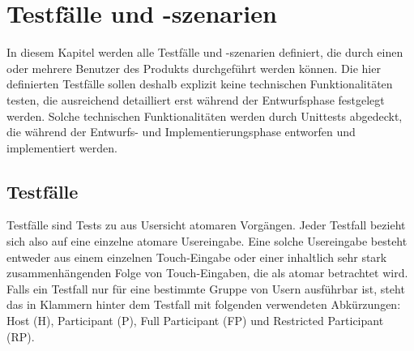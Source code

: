 \documentclass[oneside, ngerman]{sdqtechreport}
\begin{document}
\chapter{Testfälle und -szenarien}
\label{chap:Tests}

In diesem Kapitel werden alle Testfälle und -szenarien definiert, die durch einen oder mehrere Benutzer des Produkts durchgeführt werden können. Die hier definierten Testfälle sollen deshalb explizit keine technischen Funktionalitäten testen, die ausreichend detailliert erst während der Entwurfsphase festgelegt werden. Solche technischen Funktionalitäten werden durch Unittests abgedeckt, die während der Entwurfs- und Implementierungsphase entworfen und implementiert werden.

\section{Testfälle}
\label{sec:Tests:Testfälle}

Testfälle sind Tests zu aus Usersicht atomaren Vorgängen. Jeder Testfall bezieht sich also auf eine einzelne atomare Usereingabe. Eine solche Usereingabe besteht entweder aus einem einzelnen Touch-Eingabe oder einer inhaltlich sehr stark zusammenhängenden Folge von Touch-Eingaben, die als atomar betrachtet wird. Falls ein Testfall nur für eine bestimmte Gruppe von Usern ausführbar ist, steht das in Klammern hinter dem Testfall mit folgenden verwendeten Abkürzungen: Host (H), Participant (P), Full Participant (FP) und Restricted Participant (RP).
\end{document}
